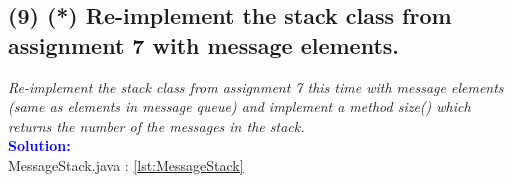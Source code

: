 \documentclass[main.tex]{subfiles}
\begin{document}
\subsection*{(9) (*) Re-implement the stack class from assignment 7 with message elements.}
\textit{Re-implement the stack class from assignment 7 this time with message elements (same as
elements in message queue) and implement a method size() which returns the number of the
messages in the stack.}\\
\indent \textbf{\textcolor{blue}{Solution:}} \\
MessageStack.java : \ref{lst:MessageStack} \\
\end{document}
